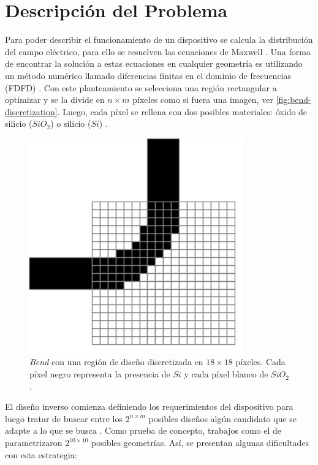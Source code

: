 \section{Descripción del Problema}


Para poder describir el funcionamiento de un dispositivo se calcula la distribución del campo eléctrico, para ello se resuelven las ecuaciones
de Maxwell \citep{Schneider2019}. 
Una forma de encontrar la solución a estas ecuaciones en cualquier geometría es utilizando un método numérico llamado diferencias finitas en el dominio de frecuencias (FDFD) \citep{Su2020}.
Con este planteamiento se selecciona una región rectangular a optimizar y se la divide  en $n \times m$  píxeles como si fuera una imagen, ver  \autoref{fig:bend-discretization}. 
Luego, cada píxel se rellena con dos posibles materiales: óxido de silicio ($SiO_2$) o silicio ($Si$) \citep{Molesky2018}.

\begin{figure}[ht]
  \centering
  \includegraphics[scale=0.6]{image/introduction/bend-discretization.png}
  \caption{\emph{Bend} con una región de diseño discretizada en $18 \times 18$
  píxeles. Cada píxel negro representa la presencia de $Si$ y cada píxel blanco
  de $SiO_2$.}
  \label{fig:bend-discretization}
\end{figure}

El diseño inverso comienza definiendo los requerimientos del dispositivo para luego tratar de buscar entre los $2^{n \times m}$ posibles diseños algún candidato que se adapte a lo que se busca \citep{Su2020, Molesky2018}.
Como prueba de concepto, trabajos como el de \cite{Malheiros-Silveira2020} parametrizaron $2^{10 \times 10}$ posibles geometrías.
Así, se presentan algunas dificultades con esta estrategia:

